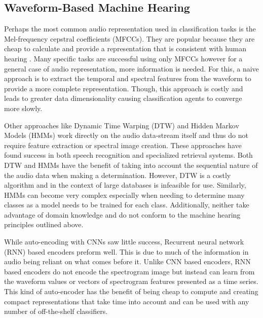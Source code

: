 \subsection{Waveform-Based Machine Hearing}
Perhaps the most common audio representation used in classification tasks is the
Mel-frequency cepstral coefficients (MFCCs). They are popular because they are
cheap to calculate and provide a representation that is consistent with human
hearing \cite{kaur-feature-2015}. Many specific tasks are successful using only
MFCCs however for a general case of audio representation, more information is
needed. For this, a naive approach is to extract the temporal and spectral
features from the waveform to provide a more complete representation. Though,
this approach is costly and leads to greater data dimensionality causing
classification agents to converge more slowly.

Other approaches like Dynamic Time Warping (DTW) and Hidden Markov Models (HMMs)
work directly on the audio data-stream itself and thus do not require feature
extraction or spectral image creation. These approaches have found success in
both speech recognition and specialized retrieval systems. Both DTW and HMMs
have the benefit of taking into account the sequential nature of the audio data
when making a determination. However, DTW is a costly algorithm and in the
context of large databases is infeasible for use. Similarly, HMMs can become very
complex especially when needing to determine many classes as a model needs to be
trained for each class. Additionally, neither take advantage of domain knowledge
and do not conform to the machine hearing principles outlined above.

While auto-encoding with CNNs saw little success, Recurrent neural network (RNN)
based encoders preform well. This is due to much of the information in audio
being reliant on what comes before it. Unlike CNN based encoders, RNN based
encoders do not encode the spectrogram image but instead can learn from the
waveform values or vectors of spectrogram features presented as a time series.
This kind of auto-encoder has the benefit of being cheap to compute and creating
compact representations that take time into account and can be used with any
number of off-the-shelf classifiers.

